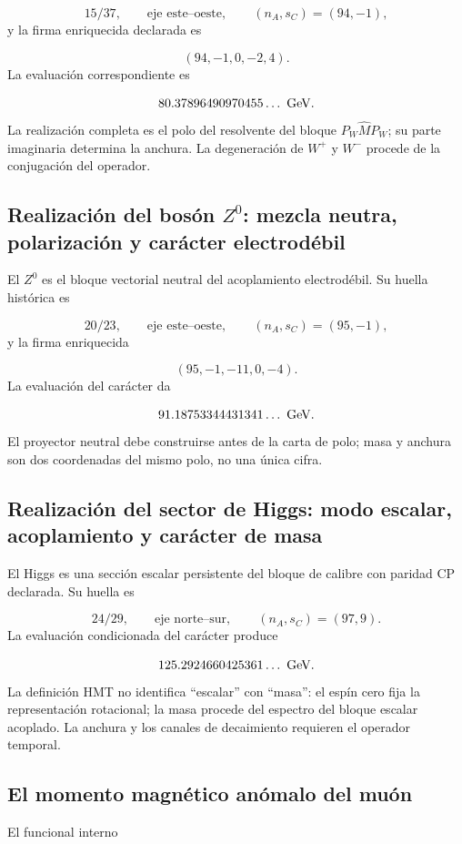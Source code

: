 \[
 15/37,\qquad \text{eje este--oeste},\qquad
 (n_A,s_C)=(94,-1),
\]
y la firma enriquecida declarada es

\[
 (94,-1,0,-2,4).
\]
La evaluación correspondiente es

\[
 80.37896490970455\ldots\ {\rm GeV}.
\]
La realización completa es el polo del resolvente del bloque \(P_W\widehat M P_W\); su parte imaginaria determina la anchura. La degeneración de \(W^+\) y \(W^-\) procede de la conjugación del operador.

\subsection{Realización del bosón \(Z^0\): mezcla neutra, polarización y carácter electrodébil}
El \(Z^0\) es el bloque vectorial neutral del acoplamiento electrodébil. Su huella histórica es

\[
 20/23,\qquad \text{eje este--oeste},\qquad
 (n_A,s_C)=(95,-1),
\]
y la firma enriquecida

\[
 (95,-1,-11,0,-4).
\]
La evaluación del carácter da

\[
 91.18753344431341\ldots\ {\rm GeV}.
\]
El proyector neutral debe construirse antes de la carta de polo; masa y anchura son dos coordenadas del mismo polo, no una única cifra.

\subsection{Realización del sector de Higgs: modo escalar, acoplamiento y carácter de masa}
El Higgs es una sección escalar persistente del bloque de calibre con paridad CP declarada. Su huella es

\[
 24/29,\qquad \text{eje norte--sur},\qquad
 (n_A,s_C)=(97,9).
\]
La evaluación condicionada del carácter produce

\[
 125.2924660425361\ldots\ {\rm GeV}.
\]
La definición HMT no identifica “escalar” con “masa”: el espín cero fija la representación rotacional; la masa procede del espectro del bloque escalar acoplado. La anchura y los canales de decaimiento requieren el operador temporal.

\subsection{El momento magnético anómalo del muón}
El funcional interno

